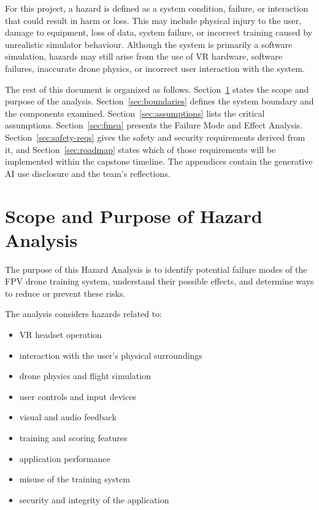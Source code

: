 \documentclass{article}
\begin{document}
For this project, a hazard is defined as a system condition, failure, or
interaction that could result in harm or loss. This may include physical injury
to the user, damage to equipment, loss of data, system failure, or incorrect
training caused by unrealistic simulator behaviour. Although the system is 
primarily a software simulation, hazards may still arise from the use of VR 
hardware, software failures, inaccurate drone physics, or incorrect user
interaction with the system.

The rest of this document is organized as follows.
Section~\ref{sec:scope} states the scope and purpose of the analysis.
Section~\ref{sec:boundaries} defines the system boundary and the components
examined. Section~\ref{sec:assumptions} lists the critical assumptions.
Section~\ref{sec:fmea} presents the Failure Mode and Effect Analysis.
Section~\ref{sec:safety-reqs} gives the safety and security requirements
derived from it, and Section~\ref{sec:roadmap} states which of those
requirements will be implemented within the capstone timeline. The appendices
contain the generative AI use disclosure and the team's reflections.

\section{Scope and Purpose of Hazard Analysis}\label{sec:scope}

The purpose of this Hazard Analysis is to identify potential failure modes of
the FPV drone training system, understand their possible effects, and determine
ways to reduce or prevent these risks.

The analysis considers hazards related to:

\begin{itemize}
    \item VR headset operation
    \item interaction with the user's physical surroundings
    \item drone physics and flight simulation
    \item user controls and input devices
    \item visual and audio feedback
    \item training and scoring features
    \item application performance
    \item misuse of the training system 
    \item security and integrity of the application
\end{itemize}
\end{document}
